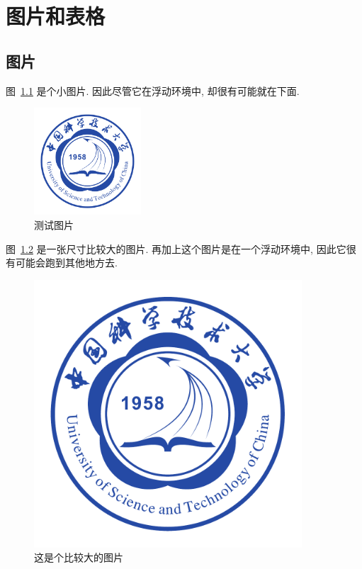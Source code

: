 \chapter{图片和表格}

\section{图片}

图~\ref{fig:test} 是个小图片. 因此尽管它在浮动环境中, 却很有可能就在下面.

\begin{figure}[!htb]
\centering
\includegraphics[width=4cm]{logo/ustc_logo_fig}
\caption{测试图片}
\label{fig:test}
\end{figure}

图~\ref{fig:bigfigure} 是一张尺寸比较大的图片. 再加上这个图片是在一个浮动环境中, 因此它很有可能会跑到其他地方去.

\begin{figure}[!htb]
\centering
\includegraphics[width=10cm]{logo/ustc_logo_fig}
\caption{这是个比较大的图片}
\label{fig:bigfigure}
\end{figure}

